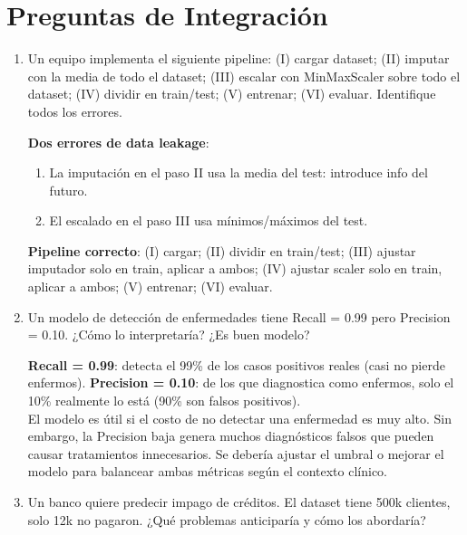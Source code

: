 \documentclass[11pt,a4paper]{article}
\begin{document}
\section{Preguntas de Integraci\'on}

\begin{enumerate}[label=\textbf{P\arabic*.}, resume]

\item Un equipo implementa el siguiente pipeline: (I) cargar dataset; (II) imputar con la
  media de todo el dataset; (III) escalar con MinMaxScaler sobre todo el dataset; (IV)
  dividir en train/test; (V) entrenar; (VI) evaluar. Identifique todos los errores.

\begin{answerbox}
\textbf{Dos errores de data leakage}:
\begin{enumerate}[label=\arabic*., topsep=2pt, itemsep=2pt]
  \item La imputaci\'on en el paso II usa la media del test: introduce info del futuro.
  \item El escalado en el paso III usa m\'inimos/m\'aximos del test.
\end{enumerate}
\textbf{Pipeline correcto}: (I) cargar; (II) dividir en train/test; (III) ajustar
imputador solo en train, aplicar a ambos; (IV) ajustar scaler solo en train, aplicar
a ambos; (V) entrenar; (VI) evaluar.
\end{answerbox}

\item Un modelo de detecci\'on de enfermedades tiene Recall = 0.99 pero Precision = 0.10.
  ¿C\'omo lo interpretar\'ia? ¿Es buen modelo?

\begin{answerbox}
\textbf{Recall = 0.99}: detecta el 99\% de los casos positivos reales (casi no pierde
enfermos). \textbf{Precision = 0.10}: de los que diagnostica como enfermos, solo el 10\%
realmente lo est\'a (90\% son falsos positivos).\\[4pt]
El modelo es \'util si el costo de no detectar una enfermedad es muy alto. Sin embargo,
la Precision baja genera muchos diagn\'osticos falsos que pueden causar tratamientos
innecesarios. Se deber\'ia ajustar el umbral o mejorar el modelo para balancear ambas
m\'etricas seg\'un el contexto cl\'inico.
\end{answerbox}

\item Un banco quiere predecir impago de cr\'editos. El dataset tiene 500k clientes,
  solo 12k no pagaron. ¿Qu\'e problemas anticipar\'ia y c\'omo los abordar\'ia?


\end{enumerate}
\end{document}
